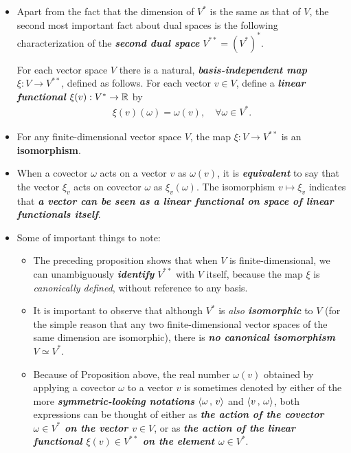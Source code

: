\documentclass[11pt]{article}
\begin{document}
\begin{itemize}
\item \begin{definition}
Apart from the fact that the dimension of $V^{*}$ is the same as that of $V$, the second most important fact about dual spaces is the following characterization of the \emph{\textbf{second dual space}} $V^{**} = (V^{*})^{*}$.

For each vector space $V$ there is a natural, \emph{\textbf{basis-independent map}} $\xi: V \rightarrow V^{**}$, defined as follows. For each vector $v \in V$, define a \emph{\textbf{linear functional}} $\xi(v): V^{*} \rightarrow {\mathbb R}$ by
\begin{align}
\xi(v)(\omega) = \omega(v), \quad \forall \omega \in V^{*}. \label{eqn: double_dual_vector}
\end{align}
\end{definition}

\item \begin{proposition}
For any finite-dimensional vector space $V$, the map $\xi: V \rightarrow V^{**}$ is an \textbf{isomorphism}.
\end{proposition}

\item \begin{remark}
When a covector $\omega$ acts on a vector $v$ as $\omega(v)$, it is \textbf{\emph{equivalent}} to say that the vector $\xi_v$ acts on covector $\omega$ as $\xi_v(\omega)$. The isomorphism $v \mapsto \xi_v$ indicates that \emph{\textbf{a vector can be seen as a linear functional on space of linear functionals itself}}.
\end{remark}

\item \begin{remark} Some of important things to note:
\begin{itemize}
\item The preceding proposition shows that when $V$ is finite-dimensional, we can unambiguously \textbf{\emph{identify}} $V^{**}$ with $V$ itself, because the map $\xi$ is \emph{canonically defined}, without reference to any basis. 

\item It is important to observe that although $V^{*}$ is \emph{also \textbf{isomorphic}} to $V$ (for the simple reason that any two finite-dimensional vector spaces of the same dimension are isomorphic), there is \emph{\textbf{no canonical isomorphism}} $V \simeq V^{*}$.

\item Because of Proposition above, the real number $\omega(v)$ obtained by applying a covector $\omega$ to a vector $v$ is sometimes denoted by either of the more \emph{\textbf{symmetric-looking notations}} $\left\langle \omega\,,\, v \right\rangle$ and $\left\langle v\,,\, \omega \right\rangle$, both expressions can be thought of either as \emph{\textbf{the action of the covector $\omega \in V^{*}$ on the vector $v \in V$}}, or as \emph{\textbf{the action of the linear functional $\xi(v) \in V^{**}$ on the element $\omega \in V^{*}$}}. 


\end{itemize}
\end{remark}
\end{itemize}
\end{document}

